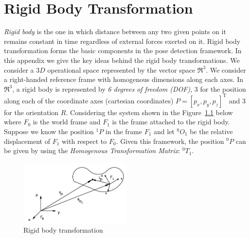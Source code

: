 
\chapter{Rigid Body Transformation} %

\label{AppendixB} %


	\emph{Rigid body} is the one in which distance between any two given points on it remains constant in time regardless of external forces exerted on it. Rigid body transformation forms the basic components in the pose detection framework. In this appendix we give the key ideas behind the rigid body transformations. We consider a $3D$ operational space represented by the vector space $\Re^3$. We consider a right-handed reference frame with homogenous dimensions along each axes. In $\Re^3$, a rigid body is represented by \emph{6 degrees of freedom (DOF)}, 3 for the position along each of the coordinate axes (cartesian coordinates) $P = [p_x,p_y,p_z]^{\text{T}}$ and 3 for the orientation $R$. Considering the system shown in the Figure~\ref{fig:frame_ref} below where $F_0$ is the world frame and $F_1$ is the frame attached to the rigid body. Suppose we know the position $^{1}P$ in the frame $F_1$ and let $^{0}O_1$ be the relative displacement of $F_1$ with respect to $F_0$. Given this framework, the position $^{0}P$ can be given by using the \emph{Homogenous Transformation Matrix}: $^{0}T_1$.
	
\begin{figure}
\begin{center}
\includegraphics[width=0.5\textwidth]{assets/rigid_body.png}
\end{center}
\caption{Rigid body transformation}
\label{fig:frame_ref}
\end{figure}


